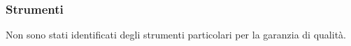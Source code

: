 	\subsubsection{Strumenti}

	Non sono stati identificati degli strumenti particolari per la garanzia di qualità.
	




%
%
%
%
%
%
%
%
